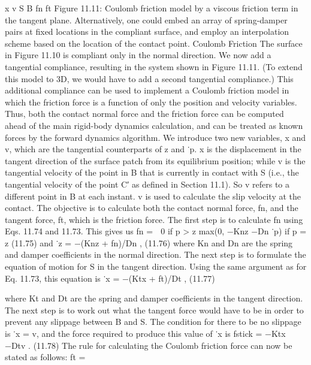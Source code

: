 x v S B fn ft Figure 11.11: Coulomb friction model by a viscous friction term in the tangent plane. Alternatively, one could embed an array of spring-damper pairs at fixed locations in the compliant surface, and employ an interpolation scheme based on the location of the contact point. Coulomb Friction The surface in Figure 11.10 is compliant only in the normal direction. We now add a tangential compliance, resulting in the system shown in Figure 11.11. (To extend this model to 3D, we would have to add a second tangential compliance.) This additional compliance can be used to implement a Coulomb friction model in which the friction force is a function of only the position and velocity variables. Thus, both the contact normal force and the friction force can be computed ahead of the main rigid-body dynamics calculation, and can be treated as known forces by the forward dynamics algorithm. We introduce two new variables, x and v, which are the tangential counterparts of z and ˙p. x is the displacement in the tangent direction of the surface patch from its equilibrium position; while v is the tangential velocity of the point in B that is currently in contact with S (i.e., the tangential velocity of the point C′ as defined in Section 11.1). So v refers to a different point in B at each instant. v is used to calculate the slip velocity at the contact. The objective is to calculate both the contact normal force, fn, and the tangent force, ft, which is the friction force. The first step is to calculate fn using Eqs. 11.74 and 11.73. This gives us fn =  0 if p > z max(0, −Knz −Dn ˙p) if p = z (11.75) and ˙z = −(Knz + fn)/Dn , (11.76) where Kn and Dn are the spring and damper coefficients in the normal direction. The next step is to formulate the equation of motion for S in the tangent direction. Using the same argument as for Eq. 11.73, this equation is ˙x = −(Ktx + ft)/Dt , (11.77)

where Kt and Dt are the spring and damper coefficients in the tangent direction. The next step is to work out what the tangent force would have to be in order to prevent any slippage between B and S. The condition for there to be no slippage is ˙x = v, and the force required to produce this value of ˙x is fstick = −Ktx −Dtv . (11.78) The rule for calculating the Coulomb friction force can now be stated as follows: ft =

